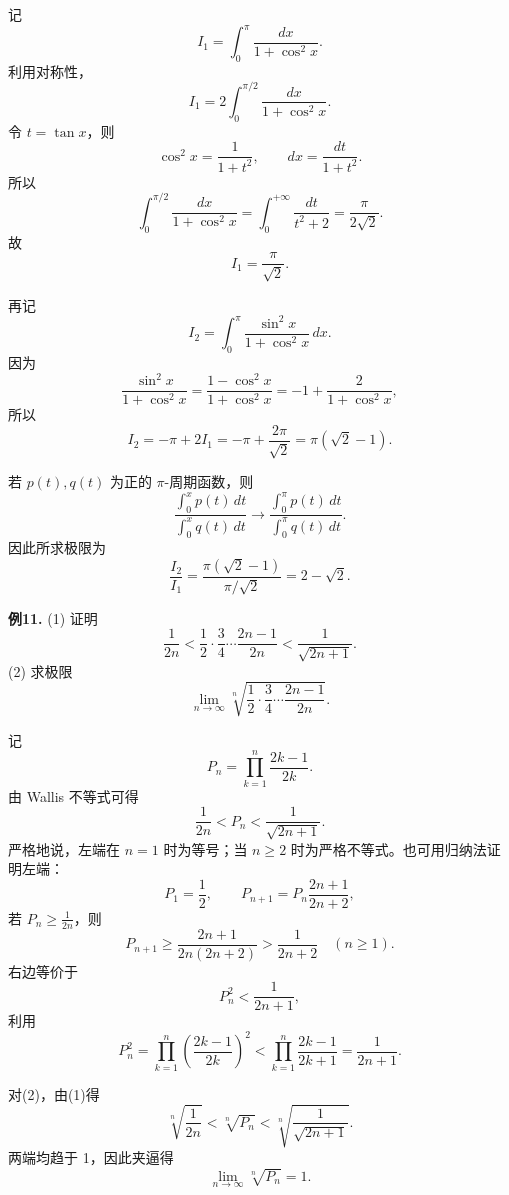 \begin{solutionblock}

记
\[
I_1=\int_0^\pi\frac{dx}{1+\cos^2x}.
\]
利用对称性，
\[
I_1=2\int_0^{\pi/2}\frac{dx}{1+\cos^2x}.
\]
令 \(t=\tan x\)，则
\[
\cos^2x=\frac1{1+t^2},\qquad dx=\frac{dt}{1+t^2}.
\]
所以
\[
\int_0^{\pi/2}\frac{dx}{1+\cos^2x}
=\int_0^{+\infty}\frac{dt}{t^2+2}
=\frac{\pi}{2\sqrt2}.
\]
故
\[
I_1=\frac{\pi}{\sqrt2}.
\]

再记
\[
I_2=\int_0^\pi\frac{\sin^2x}{1+\cos^2x}\,dx.
\]
因为
\[
\frac{\sin^2x}{1+\cos^2x}
=\frac{1-\cos^2x}{1+\cos^2x}
=-1+\frac{2}{1+\cos^2x},
\]
所以
\[
I_2=-\pi+2I_1
=-\pi+\frac{2\pi}{\sqrt2}
=\pi(\sqrt2-1).
\]

若 \(p(t),q(t)\) 为正的 \(\pi\)-周期函数，则
\[
\frac{\int_0^x p(t)\,dt}{\int_0^x q(t)\,dt}
\to
\frac{\int_0^\pi p(t)\,dt}{\int_0^\pi q(t)\,dt}.
\]
因此所求极限为
\[
\frac{I_2}{I_1}
=\frac{\pi(\sqrt2-1)}{\pi/\sqrt2}
=2-\sqrt2.
\]

\end{solutionblock}

\begin{problemblock}
\textbf{例11.} (1) 证明
\[
\frac1{2n}<\frac12\cdot\frac34\cdots\frac{2n-1}{2n}<\frac1{\sqrt{2n+1}}.
\]
(2) 求极限
\[
\lim_{n\to\infty}\sqrt[n]{\frac12\cdot\frac34\cdots\frac{2n-1}{2n}}.
\]
\end{problemblock}

\begin{solutionblock}

记
\[
P_n=\prod_{k=1}^n\frac{2k-1}{2k}.
\]
由 Wallis 不等式可得
\[
\frac1{2n}<P_n<\frac1{\sqrt{2n+1}}.
\]
严格地说，左端在 \(n=1\) 时为等号；当 \(n\ge2\) 时为严格不等式。也可用归纳法证明左端：
\[
P_1=\frac12,\qquad
P_{n+1}=P_n\frac{2n+1}{2n+2},
\]
若 \(P_n\ge\frac1{2n}\)，则
\[
P_{n+1}\ge\frac{2n+1}{2n(2n+2)}>\frac1{2n+2}\quad(n\ge1).
\]
右边等价于
\[
P_n^2<\frac1{2n+1},
\]
利用
\[
P_n^2=\prod_{k=1}^n\left(\frac{2k-1}{2k}\right)^2
<\prod_{k=1}^n\frac{2k-1}{2k+1}
=\frac1{2n+1}.
\]

对(2)，由(1)得
\[
\sqrt[n]{\frac1{2n}}<\sqrt[n]{P_n}<\sqrt[n]{\frac1{\sqrt{2n+1}}}.
\]
两端均趋于 1，因此夹逼得
\[
\lim_{n\to\infty}\sqrt[n]{P_n}=1.
\]

\end{solutionblock}


